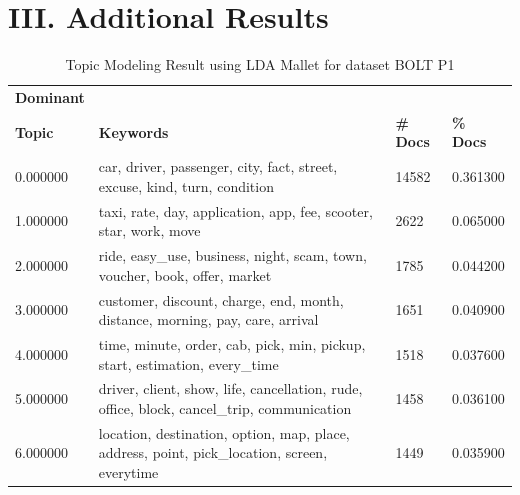 \documentclass[12pt]{article}
\begin{document}
\newpage
\section*{III. Additional Results}

\begin{table}[h]
\centering
\caption{Topic Modeling Result using LDA Mallet for dataset BOLT P1}
\begin{tabular}{|p{2cm}|p{8cm}|p{1cm}|p{2cm}|}
\hline
\centering
\textbf{Dominant}\\\textbf{Topic} & \textbf{Keywords} & \textbf{\# Docs} & \textbf{\% Docs}  \\ 
\hline
0.000000                                                                  & car, driver, passenger, city, fact, street, excuse, kind, turn, condition                                                    & 14582                   & 0.361300                  \\
1.000000                                                                  & taxi, rate, day, application, app, fee, scooter, star, work, move                                                            & 2622                    & 0.065000                  \\
2.000000                                                                  & ride, easy\_use, business, night, scam, town, voucher, book, offer, market                                                   & 1785                    & 0.044200                  \\
3.000000                                                                  & customer, discount, charge, end, month, distance, morning, pay, care, arrival                                                & 1651                    & 0.040900                  \\
4.000000                                                                  & time, minute, order, cab, pick, min, pickup, start, estimation, every\_time                                                  & 1518                    & 0.037600                  \\
5.000000                                                                  & driver, client, show, life, cancellation, rude, office, block, cancel\_trip, communication                                   & 1458                    & 0.036100                  \\
6.000000                                                                  & location, destination, option, map, place, address, point, pick\_location, screen, everytime                                 & 1449                    & 0.035900                  \\

\end{tabular}
\end{table}
\end{document}
